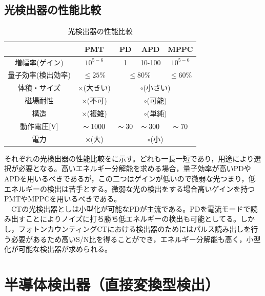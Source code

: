 \section{光検出器の性能比較}

\begin{table}[H]
\begin{center}
\begin{tabular}{ccccc} \hline
 & PMT & PD & APD & MPPC \\\hline
増幅率(ゲイン) & $10^{5-6}$ & 1 & 10-100 & $10^{5-6}$ \\
量子効率(検出効率) & $\leq25\%$ & \multicolumn{2}{c}{$\leq80\%$} & $\leq60\%$ \\
体積・サイズ& ×(大きい) & \multicolumn{3}{c}{$\circ$(小さい)} \\
磁場耐性 & ×(不可) & \multicolumn{3}{c}{$\circ$(可能)} \\
構造 & ×(複雑) & \multicolumn{3}{c}{$\circ$(単純)} \\
動作電圧[V] & $\thicksim1000$ & $\thicksim30$ & $\thicksim300$& $\thicksim70$ \\
電力&×(大)&\multicolumn{3}{c}{$\circ$(小)}\\\hline
\end{tabular}
\end{center}
\caption{光検出器の性能比較\cite{kataoka}}
\label{detectors}
\end{table}
それぞれの光検出器の性能比較をに示す。どれも一長一短であり，用途により選択が必要となる。高いエネルギー分解能を求める場合，量子効率が高いPDやAPDを用いるべきであるが，この二つはゲインが低いので微弱な光つまり，低エネルギーの検出は苦手とする。微弱な光の検出をする場合高いゲインを持つPMTやMPPCを用いるべきである。\\
\ \ CTの光検出器としは小型化が可能なPDが主流である。PDを電流モードで読み出すことによりノイズに打ち勝ち低エネルギーの検出も可能としてる。しかし，フォトンカウンティングCTにおける検出器のためにはパルス読み出しを行う必要があるため高いS/N比を得ることができ，エネルギー分解能も高く，小型化が可能な検出器が求められる。

\chapter{半導体検出器（直接変換型検出）}
